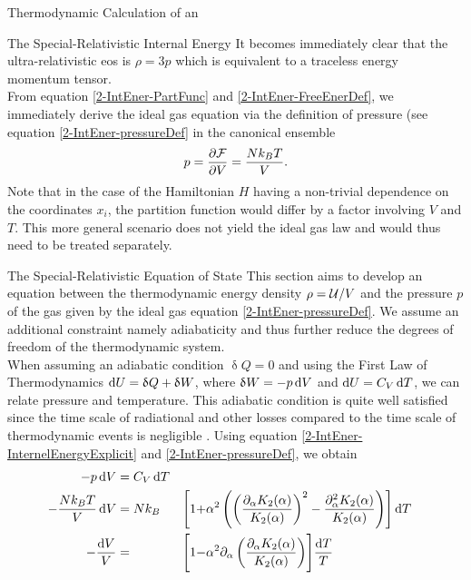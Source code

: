 \begin{section}{Thermodynamic Calculation of an }
\begin{subsection}{The Special-Relativistic Internal Energy}
It becomes immediately clear that the ultra-relativistic \ac{eos} is $\rho=3p$ which is equivalent to a traceless energy momentum tensor.\\
From equation \eqref{2-IntEner-PartFunc} and \eqref{2-IntEner-FreeEnerDef}, we immediately derive the ideal gas equation via the definition of pressure (see equation \eqref{2-IntEner-pressureDef} in the canonical ensemble
\begin{equation}
    p=\frac{\partial\mathcal{F}}{\partial V} = \frac{Nk_ BT}{V}.
    \label{2-IntEner-IdealGasEq}
\end{equation}
Note that in the case of the Hamiltonian $H$ having a non-trivial dependence on the coordinates $x_i$, the partition function would differ by a factor involving $V$ and $T$.
This more general scenario does not yield the ideal gas law and would thus need to be treated separately.
\end{subsection}
%
%
%
\begin{subsection}{The Special-Relativistic Equation of State}
\label{2-IntEner-SR-EOS-Derivation}
This section aims to develop an equation between the thermodynamic energy density $\rho=\mathcal{U}/V$ and the pressure $p$ of the gas given by the ideal gas equation \eqref{2-IntEner-pressureDef}.
We assume an additional constraint namely adiabaticity and thus further reduce the degrees of freedom of the thermodynamic system.\\ %
When assuming an adiabatic condition $\updelta Q=0$ and using the First Law of Thermodynamics \cite{fliessbachStatistischePhysikLehrbuch2018} $\mathop{}\!\mathrm{d} U =\updelta Q + \updelta W$, where $\updelta W=-p\mathop{}\!\mathrm{d} V$ and $\mathop{}\!\mathrm{d} U=C_V\mathop{}\!\mathrm{d} T$, we can relate pressure and temperature. 
This adiabatic condition is quite well satisfied since the time scale of radiational and other losses compared to the time scale of thermodynamic events is negligible \cite{noerdlingerSolarMassLoss2008, vinkMassLossStellar2017}.
Using equation \eqref{2-IntEner-InternelEnergyExplicit} and \eqref{2-IntEner-pressureDef}, we obtain
\begin{alignat}{3}
    -p\diff V &= C_V\diff T\\
    -\frac{Nk_BT}{V}\diff V &= Nk_B &\Biggl[1 + &\alpha^2\left(\left(\frac{\partial_\alpha K_2(\alpha)}{K_2(\alpha)}\right)^2 - \frac{\partial^2_\alpha K_2(\alpha)}{K_2(\alpha)}\right)\Biggr]\diff T\\
    - \frac{\diff V}{V} &= &\Biggl[1 - &\alpha^2\partial_\alpha\left(\frac{\partial_\alpha K_2(\alpha)}{K_2(\alpha)}\right)\Biggr]\frac{\diff T}{T}\\

\end{alignat}
\end{subsection}
\end{section}
